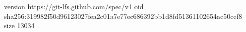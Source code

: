 version https://git-lfs.github.com/spec/v1
oid sha256:319982f50d96123027fea2c01a7e77ec686392bb1d8fd51361102654ac50cef8
size 13034
